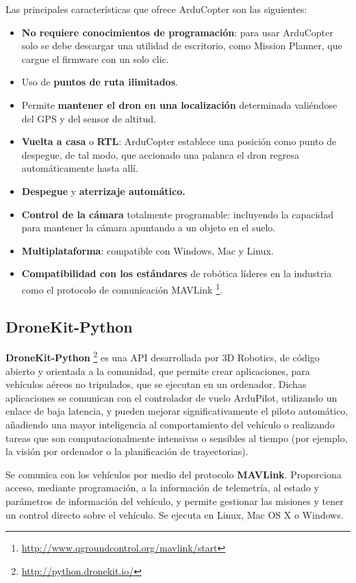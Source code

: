 Las principales características que ofrece ArduCopter son las siguientes:
\begin{itemize}
\item \textbf{No requiere conocimientos de programación}: para usar ArduCopter solo se debe descargar una utilidad de escritorio, como 
Mission Planner, que cargue el firmware con un solo clic.
\item Uso de \textbf{puntos de ruta ilimitados}.
\item Permite \textbf{mantener el dron en una localización} determinada valiéndose del \acs{GPS} y del sensor de altitud.
\item \textbf{Vuelta a casa} o \textbf{\acs{RTL}}: ArduCopter establece una posición como punto de despegue, de tal modo, que accionado una palanca el dron regresa automáticamente hasta allí.
\item \textbf{Despegue} y \textbf{aterrizaje automático.}
\item \textbf{Control de la cámara} totalmente programable: incluyendo la capacidad para mantener la cámara apuntando a un objeto en el suelo.
\item \textbf{Multiplataforma}: compatible con Windows, Mac y Linux.
\item \textbf{Compatibilidad con los estándares} de robótica líderes en la industria como el protocolo de comunicación MAVLink \footnote{\url{http://www.qgroundcontrol.org/mavlink/start}}.
\end{itemize}

\subsection{DroneKit-Python}
\label{sec:dronekit}

\textbf{DroneKit-Python} \footnote{\url{http://python.dronekit.io/}} es una \acs{API} desarrollada por 3D Robotics, de código abierto y orientada a la comunidad, que permite crear aplicaciones, para vehículos aéreos no tripulados, que se 
ejecutan en un ordenador. Dichas aplicaciones se comunican con el controlador de vuelo ArduPilot, utilizando un enlace de baja latencia, y pueden mejorar significativamente el piloto automático, añadiendo una mayor inteligencia al comportamiento del vehículo o realizando tareas que son computacionalmente intensivas o sensibles al tiempo (por ejemplo, la visión por ordenador o la planificación de trayectorias).

Se comunica con los vehículos por medio del protocolo \textbf{MAVLink}. Proporciona acceso, mediante programación, a la información 
de telemetría, al estado y parámetros de información del vehículo, y permite gestionar las misiones y tener un control directo 
sobre el vehículo. Se ejecuta en Linux, Mac OS X o Windows.

